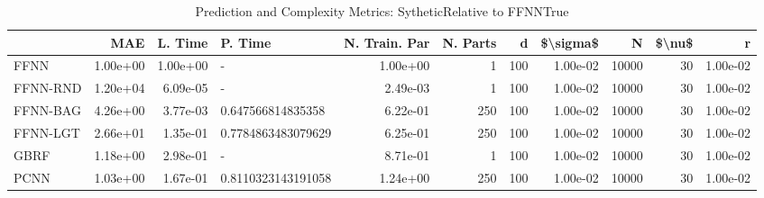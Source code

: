 \begin{table}
\centering
\caption{Prediction and Complexity Metrics: SytheticRelative to FFNNTrue}
\label{tab__Sythetic__Fix_Neurons_QTrue}
\begin{tabular}{lrrlrrrrrrr}
\toprule
{} &      MAE &  L. Time &             P. Time &  N. Train. Par &  N. Parts &    d &  \$\textbackslash sigma\$ &      N &  \$\textbackslash nu\$ &        r \\
\midrule
FFNN     & 1.00e+00 & 1.00e+00 &                   - &       1.00e+00 &         1 &  100 &  1.00e-02 &  10000 &     30 & 1.00e-02 \\
FFNN-RND & 1.20e+04 & 6.09e-05 &                   - &       2.49e-03 &         1 &  100 &  1.00e-02 &  10000 &     30 & 1.00e-02 \\
FFNN-BAG & 4.26e+00 & 3.77e-03 &   0.647566814835358 &       6.22e-01 &       250 &  100 &  1.00e-02 &  10000 &     30 & 1.00e-02 \\
FFNN-LGT & 2.66e+01 & 1.35e-01 &  0.7784863483079629 &       6.25e-01 &       250 &  100 &  1.00e-02 &  10000 &     30 & 1.00e-02 \\
GBRF     & 1.18e+00 & 2.98e-01 &                   - &       8.71e-01 &         1 &  100 &  1.00e-02 &  10000 &     30 & 1.00e-02 \\
PCNN     & 1.03e+00 & 1.67e-01 &  0.8110323143191058 &       1.24e+00 &       250 &  100 &  1.00e-02 &  10000 &     30 & 1.00e-02 \\
\bottomrule
\end{tabular}
\end{table}
